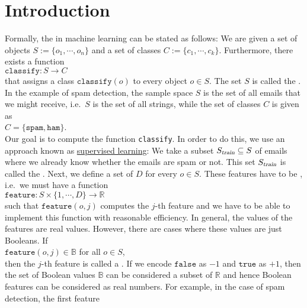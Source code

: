 \section{Introduction}
Formally, the  in machine learning can be stated as follows:  We are given a
set of objects $S := \{ o_1, \cdots, o_n \}$ and a set of classes $C := \{ c_1, \cdots, c_k \}$.  Furthermore, there exists a function 
\\[0.2cm]
\hspace*{1.3cm}
$\mathtt{classify}: S \rightarrow C$
\\[0.2cm]
that assigns a class $\texttt{classify}(o)$ to every object $o \in S$.  The set $S$ is called the .
In the example of spam detection, the sample space $S$ is the set of all emails that we might receive, i.e.~$S$
is the set of all strings, while the set of classes $C$ is given as
\\[0.2cm]
\hspace*{1.3cm}
$C = \{ \mathtt{spam}, \mathtt{ham} \}$.
\\[0.2cm]
Our goal is to compute the function \texttt{classify}.  In order to do this, we use an approach known as
\href{https://en.wikipedia.org/wiki/Supervised_learning}{supervised learning}:  We take a subset $S_\textsl{train} \subseteq S$ of
emails where we already know whether the emails are spam or not.  This set $S_\textsl{train}$ is called the .
Next, we define a set of $D$  for every $o \in S$.  These features have to be ,
i.e.~we must have a function
\\[0.2cm]
\hspace*{1.3cm}
$\mathtt{feature}: S \times \{ 1, \cdots, D \} \rightarrow \mathbb{R}$ 
\\[0.2cm]
such that $\mathtt{feature}(o, j)$ computes the $j$-th feature and we have to be able to implement
this function with reasonable efficiency.  In general, the values of the features are real values.
However, there are cases where these values are just 
Booleans.  If
\\[0.2cm]
\hspace*{1.3cm}
$\texttt{feature}(o, j) \in \mathbb{B}$ \quad for all $o \in S$,
\\[0.2cm]
then the $j$-th feature is called a .  If we encode $\mathtt{false}$ as $-1$ and $\mathtt{true}$ as
$+1$, then the set of Boolean values $\mathbb{B}$ can be considered a subset of $\mathbb{R}$ and hence Boolean features can be considered
as real numbers.  For example, in the case of spam detection, the first feature
